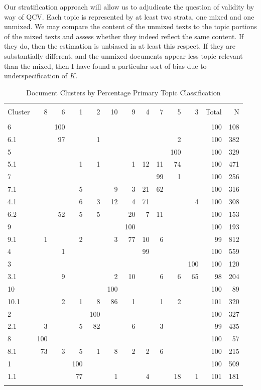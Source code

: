 \documentclass[]{book}
\theoremstyle{definition}
\theoremstyle{definition}
\theoremstyle{definition}
\theoremstyle{remark}
\begin{document}
Our stratification approach will allow us to adjudicate the question of
validity by way of QCV. Each topic is represented by at least two
strata, one mixed and one unmixed. We may compare the content of the
unmixed texts to the topic portions of the mixed texts and assess
whether they indeed reflect the same content. If they do, then the
estimation is unbiased in at least this respect. If they are
substantially different, and the unmixed documents appear less topic
relevant than the mixed, then I have found a particular sort of bias due
to underspecification of \(K\).

\begin{table}[!htbp] \centering 
  \caption{Document Clusters by Percentage Primary Topic Classification} 
  \label{tab:hottable} 
\begin{tabular}{@{\extracolsep{5pt}} lrrrrrrrrrrrr} 
\\[-1.8ex]\hline 
\hline \\[-1.8ex] 
Cluster & 8 & 6 & 1 & 2 & 10 & 9 & 4 & 7 & 5 & 3 & Total & N \\ 
\hline \\[-1.8ex] 
6 &  & 100 &  &  &  &  &  &  &  &  & 100 & 108 \\ 
6.1 &  & 97 &  & 1 &  &  &  &  & 2 &  & 100 & 382 \\ 
5 &  &  &  &  &  &  &  &  & 100 &  & 100 & 329 \\ 
5.1 &  &  & 1 & 1 &  & 1 & 12 & 11 & 74 &  & 100 & 471 \\ 
7 &  &  &  &  &  &  &  & 99 & 1 &  & 100 & 256 \\ 
7.1 &  &  & 5 &  & 9 & 3 & 21 & 62 &  &  & 100 & 316 \\ 
4.1 &  &  & 6 & 3 & 12 & 4 & 71 &  &  & 4 & 100 & 308 \\ 
6.2 &  & 52 & 5 & 5 &  & 20 & 7 & 11 &  &  & 100 & 153 \\ 
9 &  &  &  &  &  & 100 &  &  &  &  & 100 & 193 \\ 
9.1 & 1 &  & 2 &  & 3 & 77 & 10 & 6 &  &  & 99 & 812 \\ 
4 &  & 1 &  &  &  &  & 99 &  &  &  & 100 & 559 \\ 
3 &  &  &  &  &  &  &  &  &  & 100 & 100 & 120 \\ 
3.1 &  & 9 &  &  & 2 & 10 &  & 6 & 6 & 65 & 98 & 204 \\ 
10 &  &  &  &  & 100 &  &  &  &  &  & 100 & 89 \\ 
10.1 &  & 2 & 1 & 8 & 86 & 1 &  & 1 & 2 &  & 101 & 320 \\ 
2 &  &  &  & 100 &  &  &  &  &  &  & 100 & 327 \\ 
2.1 & 3 &  & 5 & 82 &  & 6 &  & 3 &  &  & 99 & 435 \\ 
8 & 100 &  &  &  &  &  &  &  &  &  & 100 & 57 \\ 
8.1 & 73 & 3 & 5 & 1 & 8 & 2 & 2 & 6 &  &  & 100 & 215 \\ 
1 &  &  & 100 &  &  &  &  &  &  &  & 100 & 509 \\ 
1.1 &  &  & 77 &  & 1 &  & 4 &  & 18 & 1 & 101 & 181 \\ 
\hline \\[-1.8ex] 
\end{tabular} 
\end{table}
\end{document}

